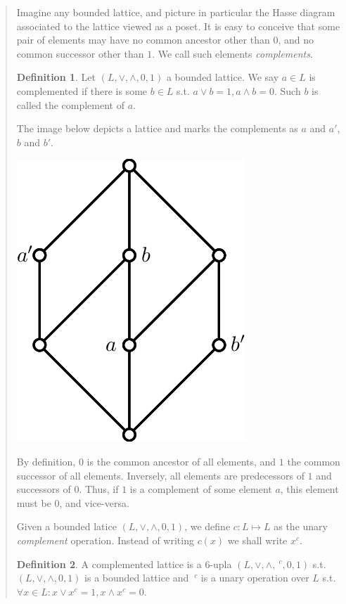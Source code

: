 \documentclass[a4paper, 12pt]{article}
\theoremstyle{definition}
\theoremstyle{definition}
\theoremstyle{definition}
\newtheorem{definition}{Definition}
\begin{document}
\begin{quote}
Imagine any bounded lattice, and picture in particular the Hasse diagram
associated to the lattice viewed as a poset. It is easy to conceive that some pair
of elements may have no common ancestor other than $0$, and no common successor
other than $1$. We call such elements \textit{complements}.

\begin{definition}
    Let $(L, \lor, \land, 0, 1)$ a bounded lattice. We say $a \in L$ is
    complemented if there is some $b \in L$ s.t. $a \lor b = 1, a\land b=0$.
    Such $b$ is called the complement of $a$.
\end{definition}

The image below depicts a lattice and marks the complements as $a$ and $a'$,
$b$ and $b'$.

\begin{center}
    \includegraphics[scale=1]{compLattice}
\end{center}

By definition, $0$ is the common ancestor of all elements,
and $1$ the common successor of all elements. Inversely, all elements are
predecessors of $1$ and successors of $0$. Thus, if $1$ is a complement of some
element $a$, this element must be $0$, and vice-versa.

Given a bounded latice $(L, \lor, \land, 0, 1)$, we define $c : L \mapsto L $
as the unary \textit{complement} operation. Instead of writing $c(x)$ we shall
write $x^c$.

\begin{definition}
    A complemented lattice is a $6$-upla $(L, \lor, \land, ~^c, 0, 1)$ s.t.
    $(L, \lor, \land, 0, 1)$ is a bounded lattice and $~^c$ is a unary
    operation over $L$ s.t. $\forall x \in L :x \lor x^c = 1, x \land x^c = 0$.
\end{definition}


\end{quote}
\end{document}
